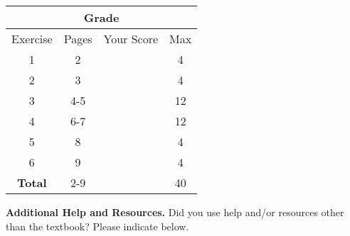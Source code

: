 \begin{multicols}{2}

\begin{tabular}{|c|c|c|c|}
\multicolumn{4}{c}{\textbf{Grade}} \\\hline
Exercise & Pages & Your Score & Max \\\hline
\multirow{2}{*}{1} & \multirow{2}{*}{2} & \multirow{2}{*}{\phantom{100100}} & \multirow{2}{*}{4} \\
& & & \\\hline
\multirow{2}{*}{2} & \multirow{2}{*}{3} & \multirow{2}{*}{\phantom{100100}} & \multirow{2}{*}{4} \\
& & & \\\hline
\multirow{2}{*}{3} & \multirow{2}{*}{4-5} & \multirow{2}{*}{\phantom{100100}} & \multirow{2}{*}{12} \\
& & & \\\hline
\multirow{2}{*}{4} & \multirow{2}{*}{6-7} & \multirow{2}{*}{\phantom{100100}} & \multirow{2}{*}{12} \\
& & & \\\hline
\multirow{2}{*}{5} & \multirow{2}{*}{8} & \multirow{2}{*}{\phantom{100100}} & \multirow{2}{*}{4} \\
& & & \\\hline
\multirow{2}{*}{6} & \multirow{2}{*}{9} & \multirow{2}{*}{\phantom{100100}} & \multirow{2}{*}{4} \\
& & & \\\hline
\multirow{2}{*}{\textbf{Total}} & \multirow{2}{*}{2-9} & \multirow{2}{*}{\phantom{100100}} & \multirow{2}{*}{40} \\
& & & \\\hline
\end{tabular}


\noindent\textbf{Additional Help and Resources.}
Did you use help and/or resources other than the textbook? Please indicate below.

\vspace{\fill}
\noindent\phantom{Dimitris}

\end{multicols}